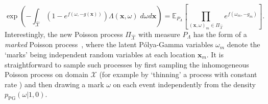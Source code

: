 \documentclass[twoside,11pt]{article}
\newcommand{\EE}[2]{\mathbb{E}_{#1}\left[ #2 \right]}
\newcommand{\set}[1]{\left\lbrace #1 \right\rbrace}
\newcommand{\bx}{\boldsymbol{x}}
\newcommand{\PG}{p_{\scriptscriptstyle \mathrm{PG}}}
\newcommand{\calS}{\mathcal{S}}
\newcommand{\X}{\mathcal{X}}
\begin{document}
\begin{equation}
\exp\left(-\int_{\hat{\X}}\left(1 - e^{f(\omega,-g(\bx))}\right) \Lambda(\bx,\omega)\;d\omega d\bx \right)
 = 
\EE{P_\Lambda}{\prod_{(\bx,\omega)_m\in \Pi_{\hat{\X}}} e^{f(\omega_m,-g_m)}}.
\end{equation}
Interestingly, the new Poisson process $\Pi_{\hat{\X}}$ with measure $P_\Lambda$ has the form of a {\it marked} Poisson process~\citep[chap. 5]{kingman1993poisson}, where the latent P\'olya-Gamma variables $\omega_m$ denote the `marks' being independent random variables at each location $\bx_m$. It is straightforward to sample such processes by first sampling the inhomogeneous Poisson process on domain $\X$ (for example by `thinning' a process with constant rate \citep{lewis1979simulation,adams2009tractable}) and then drawing a mark $\omega$ on each event independently from the density $\PG(\omega\vert 1,0)$. 
\end{document}
